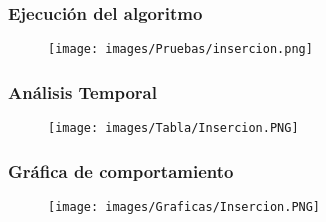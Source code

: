 \documentclass[12pt]{article}
\begin{document}
    		\subsubsection{Ejecución del algoritmo}
        		\begin{figure}[H]
        	            \centering
        	            \texttt{[image: images/Pruebas/insercion.png]}
                \end{figure}
                
    		\subsubsection{Análisis Temporal}
    		    \begin{figure}[H]
        	            \centering
        	             \texttt{[image: images/Tabla/Insercion.PNG]}
                \end{figure}
    		\subsubsection{Gráfica de comportamiento}
    		    \begin{figure}[H]
        	            \centering
        	             \texttt{[image: images/Graficas/Insercion.PNG]}
                \end{figure}
    		\newpage
\end{document}

